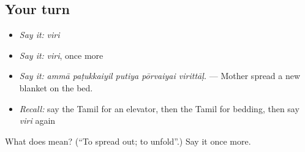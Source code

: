 \subsection*{Your turn}
\begin{itemize}
\raggedright
  \item \emph{Say it:} \emph{viri}
  \item \emph{Say it:} \emph{viri}, once more
  \item \emph{Say it:} \emph{ammā paṭukkaiyil putiya pōrvaiyai virittāḷ.} — Mother spread a new blanket on the bed.
  \item \emph{Recall:} say the Tamil for an elevator, then the Tamil for bedding, then say \emph{viri} again
\end{itemize}

\begin{tcolorbox}[breakable,colback=teal!4,colframe=teal!35!black,title={Before you move on}]
What does  mean? (\textquotedblleft{}To spread out; to unfold\textquotedblright{}.) Say it once more.
\end{tcolorbox}

